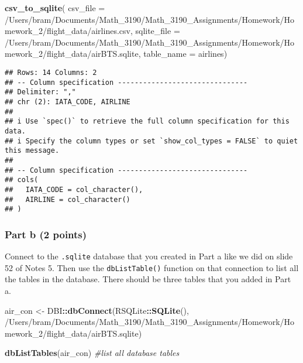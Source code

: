\documentclass[
]{article}
\newenvironment{Shaded}{\begin{snugshade}}{\end{snugshade}}
\newcommand{\AttributeTok}[1]{\textcolor[rgb]{0.13,0.29,0.53}{#1}}
\newcommand{\CommentTok}[1]{\textcolor[rgb]{0.56,0.35,0.01}{\textit{#1}}}
\newcommand{\FunctionTok}[1]{\textcolor[rgb]{0.13,0.29,0.53}{\textbf{#1}}}
\newcommand{\NormalTok}[1]{#1}
\newcommand{\OtherTok}[1]{\textcolor[rgb]{0.56,0.35,0.01}{#1}}
\newcommand{\SpecialCharTok}[1]{\textcolor[rgb]{0.81,0.36,0.00}{\textbf{#1}}}
\newcommand{\StringTok}[1]{\textcolor[rgb]{0.31,0.60,0.02}{#1}}
\begin{document}
\begin{Shaded}
\begin{Highlighting}[]
\FunctionTok{csv\_to\_sqlite}\NormalTok{( }\AttributeTok{csv\_file =} \StringTok{\textquotesingle{}/Users/bram/Documents/Math\_3190/Math\_3190\_Assignments/Homework/Homework\_2/flight\_data/airlines.csv\textquotesingle{}}\NormalTok{,}
               \AttributeTok{sqlite\_file =} \StringTok{\textquotesingle{}/Users/bram/Documents/Math\_3190/Math\_3190\_Assignments/Homework/Homework\_2/flight\_data/airBTS.sqlite\textquotesingle{}}\NormalTok{,}
               \AttributeTok{table\_name =} \StringTok{\textquotesingle{}airlines\textquotesingle{}}\NormalTok{)}
\end{Highlighting}
\end{Shaded}

\begin{verbatim}
## Rows: 14 Columns: 2
## -- Column specification -------------------------------
## Delimiter: ","
## chr (2): IATA_CODE, AIRLINE
## 
## i Use `spec()` to retrieve the full column specification for this data.
## i Specify the column types or set `show_col_types = FALSE` to quiet this message.
## 
## -- Column specification -------------------------------
## cols(
##   IATA_CODE = col_character(),
##   AIRLINE = col_character()
## )
\end{verbatim}

\hypertarget{part-b-2-points}{%
\subsubsection{Part b (2 points)}\label{part-b-2-points}}

Connect to the \texttt{.sqlite} database that you created in Part a like
we did on slide 52 of Notes 5. Then use the \texttt{dbListTable()}
function on that connection to list all the tables in the database.
There should be three tables that you added in Part a.

\begin{Shaded}
\begin{Highlighting}[]
\NormalTok{air\_con }\OtherTok{\textless{}{-}}\NormalTok{ DBI}\SpecialCharTok{::}\FunctionTok{dbConnect}\NormalTok{(RSQLite}\SpecialCharTok{::}\FunctionTok{SQLite}\NormalTok{(), }
                          \StringTok{\textquotesingle{}/Users/bram/Documents/Math\_3190/Math\_3190\_Assignments/Homework/Homework\_2/flight\_data/airBTS.sqlite\textquotesingle{}}\NormalTok{)}

\FunctionTok{dbListTables}\NormalTok{(air\_con) }\CommentTok{\#list all database tables}
\end{Highlighting}
\end{Shaded}
\end{document}
